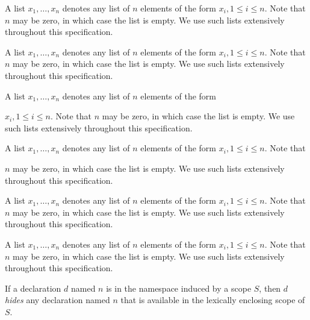 \documentclass{article}
\begin{document}
\LMHash{}
A list $x_1, \ldots, x_n$ denotes         any list of $n$ elements
of the form $x_i, 1 \le i \le n$.
		 Note that $n$ may be zero, in
which case the list is empty. We use such lists
 extensively throughout this
specification.

\LMHash{}
A list $x_1, \ldots, x_n$ denotes any list of $n$ elements%
of the form $x_i, 1%
\le i %
 \le n$. Note that $n$ may be zero, in which
case the list is empty. We use such lists extensively throughout this
specification.

\LMHash{}
A list $x_1, \ldots, x_n$ denotes any list of $n$ elements of the form


$x_i, 1 \le i \le n$. Note that $n$ may be zero, in which case the list is empty. We use such lists extensively throughout this specification.

\LMHash{}
A list $x_1, \ldots, x_n$ denotes any list of $n$ elements of the form $x_i, 1 \le i \le n$. Note that


 	 $n$ may be zero, in which case the list is empty. We use such lists extensively throughout this specification.

\LMHash{}
%
A list $x_1, \ldots, x_n$ denotes any list of $n$ elements of the form $x_i, 1 \le i \le n$. Note that $n$ may be zero, in which case the list is empty. We use such lists extensively throughout this specification.

\LMHash{}
A list $x_1, \ldots, x_n$ denotes any list of $n$ elements of the form $x_i, 1 \le i \le n$. Note that $n$ may be zero,
%
%
in which case the list is empty. We use such lists extensively throughout this specification.



\LMHash{}
If a  declaration $d$ named $n$ is in the namespace induced by a scope $S$, then $d$ {\em hides} any declaration named $n$ that is available in the lexically enclosing scope of $S$.

\end{document}
